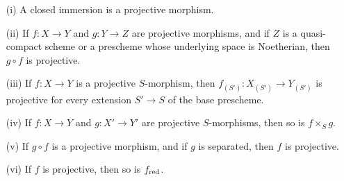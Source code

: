\begin{proposition}[5.5.5]
\label{II.5.5.5}
\medskip\noindent
\begin{enumerate}
  \item[{\rm(i)}] A closed immersion is a projective morphism.
  \item[{\rm(ii)}] If $f:X\to Y$ and $g:Y\to Z$ are projective morphisms, and if $Z$ is a quasi-compact scheme or a prescheme whose underlying space is Noetherian, then $g\circ f$ is projective.
  \item[{\rm(iii)}] If $f:X\to Y$ is a projective $S$-morphism, then $f_{(S')}:X_{(S')}\to Y_{(S')}$ is projective for every extension $S'\to S$ of the base prescheme.
  \item[{\rm(iv)}] If $f:X\to Y$ and $g:X'\to Y'$ are projective $S$-morphisms, then so is $f\times_S g$.
  \item[{\rm(v)}] If $g\circ f$ is a projective morphism, and if $g$ is separated, then $f$ is projective.
  \item[{\rm(vi)}] If $f$ is projective, then so is $f_{\mathrm{red}}$.
\end{enumerate}
\end{proposition}

